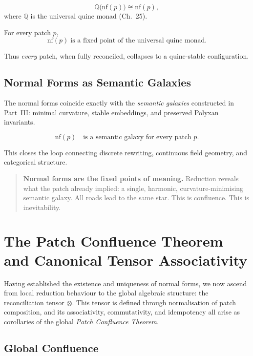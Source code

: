 \[
\mathbb{Q}\bigl(\mathrm{nf}(p)\bigr) \cong \mathrm{nf}(p),
\]
where $\mathbb{Q}$ is the universal quine monad (Ch.~25).

\begin{corollary}
For every patch $p$,
\[
\mathrm{nf}(p) \;\text{is a fixed point of the universal quine monad.}
\]
\end{corollary}

Thus \emph{every} patch, when fully reconciled,
collapses to a quine-stable configuration.

\subsection{Normal Forms as Semantic Galaxies}
\label{subsec:79-3-galaxies}

The normal forms coincide exactly with the \emph{semantic galaxies}
constructed in Part~III:
minimal curvature, stable embeddings, and preserved Polyxan invariants.

\begin{corollary}
\[
\mathrm{nf}(p)
\quad\text{is a semantic galaxy for every patch } p.
\]
\end{corollary}

This closes the loop connecting discrete rewriting, continuous field
geometry, and categorical structure.

\begin{quote}
\textbf{Normal forms are the fixed points of meaning.}  
Reduction reveals what the patch already implied:  
a single, harmonic, curvature-minimising semantic galaxy.  
All roads lead to the same star.  
This is confluence.  
This is inevitability.
\end{quote}

\section{The Patch Confluence Theorem and Canonical Tensor Associativity}
\label{sec:79-4}

Having established the existence and uniqueness of normal forms, we now ascend
from local reduction behaviour to the global algebraic structure:
the reconciliation tensor $\otimes$.
This tensor is defined through normalisation of patch composition,
and its associativity, commutativity, and idempotency all arise as
corollaries of the global \emph{Patch Confluence Theorem}.

\subsection{Global Confluence}
\label{subsec:79-4-global-confluence}

